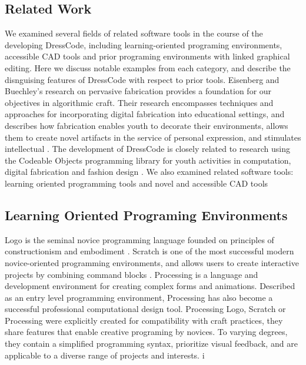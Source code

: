 \documentclass{sigchi}
\begin{document}
\vspace{-20pt}

\subsection{Related Work}
We examined several fields of related software tools in the course of the developing DressCode, including learning-oriented programing environments, accessible CAD tools and prior programing environments with linked graphical editing. Here we discuss notable examples from each category, and describe the disnguising features of DressCode with respect to prior tools.
Eisenberg and Buechley's research on pervasive fabrication provides a foundation for our objectives in algorithmic craft. Their research encompasses techniques and approaches for incorporating digital fabrication into educational settings, and describes how fabrication enables youth to decorate their environments, allows them to create novel artifacts in the service of personal expression, and stimulates intellectual  \cite{pervasive_fab}. The development of DressCode is closely related to research using the Codeable Objects programming library for youth activities in computation, digital fabrication and fashion design \cite{codeable_objects}. We also examined related software tools: learning oriented programming tools and novel and accessible CAD tools
\subsection{Learning Oriented Programing Environments}
Logo is the seminal novice programming language founded on principles of constructionism and embodiment \cite{papert}. Scratch is one of the most successful modern novice-oriented programming environments, and allows users to create interactive projects by combining command blocks \cite{resnick2}. Processing is a language and development environment for creating complex forms and animations. Described as an entry level programming environment, Processing has also become a successful professional computational design tool\cite{processing}. Processing Logo, Scratch or Processing were explicitly created for compatibility with craft practices, they share features that enable creative programing by novices. To varying degrees, they contain a simplified programming syntax, prioritize visual feedback, and are applicable to a diverse range of projects and interests.
i
\end{document}
